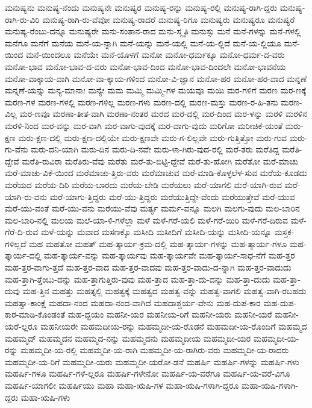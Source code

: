 {ಮನುಷ್ಯನು
ಮನುಷ್ಯ-ನೆಂದು
ಮನುಷ್ಯನೇ
ಮನುಷ್ಯರ
ಮನುಷ್ಯ-ರನ್ನು
ಮನುಷ್ಯ-ರಲ್ಲಿ
ಮನುಷ್ಯ-ರಾಗಿ-ದ್ದರು
ಮನುಷ್ಯ-ರಾಗಿ-ರು-ವಿರಿ
ಮನುಷ್ಯ-ರಾಗಿ-ರು-ವೆವೋ
ಮನುಷ್ಯ-ರಾದರೆ
ಮನುಷ್ಯ-ರಿಗೂ
ಮನುಷ್ಯರು
ಮನುಷ್ಯರೂ
ಮನುಷ್ಯರೆ
ಮನುಷ್ಯ-ರೆಂಬು-ದನ್ನೂ
ಮನುಷ್ಯರೇ
ಮನು-ಸಂತಾನ-ರಾದ
ಮನು-ಸ್ಮೃತಿ
ಮನುಸ್ಸು
ಮನೆ
ಮನೆ-ಗಳನ್ನು
ಮನೆ-ಗಳಲ್ಲಿ
ಮನೆಗೂ
ಮನೆಗೆ
ಮನೆಯ
ಮನೆ-ಯ-ನ್ನಾಗಿ
ಮನೆ-ಯನ್ನು
ಮನೆ-ಯಲ್ಲಿ
ಮನೆ-ಯ-ಲ್ಲಿದೆ
ಮನೆ-ಯ-ಲ್ಲಿಯೂ
ಮನೆ-ಯಿಂದ
ಮನೆ-ಯಿಂದಲೂ
ಮನೆಯೇ
ಮನೆ-ಯೊಳಗೆ
ಮನೋ
ಮನೋ-ಧರ್ಮಕ್ಕೂ
ಮನೋ-ಧರ್ಮ-ದ-ವರು
ಮನೋ-ಭಾವ
ಮನೋ-ಭಾವ-ದ-ವರು
ಮನೋ-ಭಾವ-ದಿಂದ
ಮನೋ-ಭಾವ-ದಿಂದಲೇ
ಮನೋ-ಭಾವನೆಯ
ಮನೋ-ವಾಕ್ಕಾಯ-ವಾಗಿ
ಮನೋ-ವಾ-ಕ್ಕಾಯ-ಗಳಿಂದ
ಮನೋ-ವಿ-ಜ್ಞಾನ
ಮನೋ-ಹರ
ಮನೋ-ಹರ-ವಾದ
ಮನ್ನಣೆ
ಮನ್ನಣೆ-ಯನ್ನು
ಮನ್ಯ-ಮಾನಾಃ
ಮನ್ಯೇ
ಮಮ
ಮಮ್ಮಿ
ಮಮ್ಮಿ-ಗಳ
ಮಯವೂ
ಮಯಿ
ಮರ-ಗಳಿಗೆ
ಮರಣ
ಮರ-ಣಕ್ಕೆ
ಮರಣ-ಗಳ
ಮರಣ-ಗಳಲ್ಲಿ
ಮರಣ-ಗಳಿಲ್ಲ
ಮರಣ-ಗಳು
ಮರಣ-ದಲ್ಲಿ
ಮರಣ-ಮಸ್ತು
ಮರಣ-ರ-ಹಿ-ತನು
ಮರಣ-ವಿಲ್ಲ
ಮರ-ಣವೂ
ಮರಣಾ-ತೀತ-ವಾಗಿ
ಮರಣಾ-ನಂತರ
ಮರದ
ಮರ-ದಲ್ಲಿ
ಮರ-ದಿಂದ
ಮರ-ಳನ್ನು
ಮರಳಿ
ಮರಳಿನ
ಮರಳಿ-ನಿಂದ
ಮರ-ವನ್ನು
ಮರ-ವಾಗಿ
ಮರ-ವಾಗು-ವುದಕ್ಕೆ
ಮರ-ವಾಗು-ವುದು
ಮರಿಗೋ
ಮರೀಚಿಕೆ-ಯಂತೆ
ಮರು-ಕ್ಷಣ
ಮರು-ಕ್ಷಣ-ದಲ್ಲಿ
ಮರು-ಕ್ಷಣ-ದಲ್ಲಿಯೇ
ಮರು-ಕ್ಷಣವೇ
ಮರು-ಗ-ಲಿಲ್ಲವೇ
ಮರು-ಗುತ್ತಿತ್ತೋ
ಮರು-ಗುವ
ಮರು-ಗು-ವೆನು
ಮರು-ದನಿ-ಯಾಗಿ
ಮರು-ದಿನ
ಮರು-ದಿ-ನವೇ
ಮರು-ಳಾ-ಗಿರು-ವುದ-ರಲ್ಲಿ
ಮರೆ-ತರು
ಮರೆತಿದ್ದ
ಮರೆತಿ-ದ್ದೇವೆ
ಮರೆತಿ-ರುವಿರಾ
ಮರೆತಿರು-ವೆವು
ಮರೆತು
ಮರೆ-ತು-ಬಿಟ್ಟಿ-ದ್ದೇವೆ
ಮರೆ-ತು-ಹೋಗಿ
ಮರೆತೋ
ಮರೆ-ಮಾಚು
ಮರೆ-ಮಾಚು-ವಿಕೆ-ಯಿಂದ
ಮರೆಮಾಚು-ತ್ತಿರು-ವರು
ಮರೆಮಾಚುವ
ಮರೆ-ಮಾಡಿ-ಕೊಳ್ಳಲೆಳ-ಸುವ
ಮರೆಯ-ಕೂಡದು
ಮರೆಯದ
ಮರೆಯ-ದಿರಿ
ಮರೆಯ-ಬಾರದು
ಮರೆಯ-ಬೇಡಿ
ಮರೆಯಲು
ಮರೆ-ಯಾಗಲಿ
ಮರೆ-ಯಾಗಿ-ರುವ
ಮರೆ-ಯಾಗಿ-ರು-ವನು
ಮರೆ-ಯಾಗು-ತ್ತಿದ್ದರು
ಮರೆ-ಯು-ತ್ತಿದ್ದರು
ಮರೆಯುತ್ತಿದ್ದೇ-ವೆಂದು
ಮರೆಯುತ್ತೇವೆ
ಮರೆ-ಯುವ
ಮರೆ-ಯು-ವಂತೆ
ಮರೆ-ಯು-ವನು
ಮರೆಯು-ವೆವು
ಮರ್ತ್ಯ
ಮರ್ಮ-ವನ್ನೂ
ಮಲಗಿ
ಮಲಗು-ವುದು
ಮಲ-ಬಾರಿನ
ಮಲ-ಬಾರಿ-ನಲ್ಲಿ
ಮಲಯ
ಮಲೆ-ಯಾ-ಳಿ-ಗಳೆಲ್ಲಾ
ಮಳೆ
ಮಳೆ-ಗರೆ-ಯಲಿ
ಮಳೆ-ಗರೆ-ಯಿರಿ
ಮಳೆ-ಗರೆ-ದಿರುವ
ಮಳೆ-ಗೆರೆ-ದಿ-ರುವ
ಮಳೆ-ಯನ್ನು
ಮವಾದ
ಮಸಣಕ್ಕೊ
ಮಸೀದಿ
ಮಸೀದಿಗೆ
ಮಸೀದಿ-ಯನ್ನು
ಮಸೀದಿ-ಯನ್ನೂ
ಮಸ್ತಕ-ಗಳಿಲ್ಲದೆ
ಮಹ
ಮಹತೋ
ಮಹತ್
ಮಹ-ತ್ಕಾರ್ಯ-ಕ್ರಮ-ದಲ್ಲಿ
ಮಹ-ತ್ಕಾರ್ಯ-ಗಳನ್ನು
ಮಹ-ತ್ಕಾರ್ಯ-ಗಳೂ
ಮಹ-ತ್ಕಾರ್ಯ-ದಲ್ಲಿ
ಮಹ-ತ್ಕಾರ್ಯ-ವನ್ನು
ಮಹ-ತ್ಕಾರ್ಯವು
ಮಹ-ತ್ಕಾರ್ಯವೇ
ಮಹ-ತ್ಕಾರ್ಯ-ಸಾಧ-ನೆಗೆ
ಮಹ-ತ್ತರ
ಮಹ-ತ್ತರ-ವಾಗು-ತ್ತದೆ
ಮಹ-ತ್ತರ-ವಾದ
ಮಹ-ತ್ತರ-ವಾದವು
ಮಹ-ತ್ತರ-ವಾದು-ದ-ನ್ನಾಗಿ
ಮಹ-ತ್ತರ-ವಾದುದು
ಮಹ-ತ್ತಾಗಿ-ತ್ತೆಂಬು-ದನ್ನು
ಮಹ-ತ್ತಾಗುತ್ತಿರು-ವುವು
ಮಹ-ತ್ತಾದ
ಮಹ-ತ್ತಾ-ದು-ದನ್ನು
ಮಹ-ತ್ತಾ-ದುದು
ಮಹ-ತ್ತಾ-ದುವು
ಮಹ-ತ್ತಿನ
ಮಹತ್ತು
ಮಹತ್ನಲ್ಲಿ
ಮಹತ್ವಕ್ಕೆ
ಮಹತ್ವದ
ಮಹತ್ವ-ವನ್ನು
ಮಹತ್ವ-ವಾಗಲಿ
ಮಹತ್ವ-ವಾಗಿ-ರಬಹದು
ಮಹತ್ವಾ-ಕಾಂಕ್ಷೆ
ಮಹದಾ-ನಂದ
ಮಹದಾ-ನಂದ-ವಾಗಿದೆ
ಮಹದಾಶ್ಚರ್ಯ-ವೇನು
ಮಹ-ದುಪ-ಕಾರ
ಮಹ-ದುಪ-ಕಾರ-ಮಾಡಿ-ಕೊಂಡಂತೆ
ಮಹ-ದ್ಭಯಂ
ಮಹನೀ-ಯರ
ಮಹನೀಯ-ರಿಗೆ
ಮಹನೀ-ಯರು
ಮಹನೀ-ಯರೆ
ಮಹನೀ-ಯರೆ-ಲ್ಲರೂ
ಮಹನೀಯರೇ
ಮಹಮದೀಯ-ರನ್ನು
ಮಹಮ್ಮದೀ-ಯ-ರೊಡನೆ
ಮಹಮದೀ-ಯ-ರೊಂದಿಗೆ
ಮಹಮ್ಮದ
ಮಹಮ್ಮದ್
ಮಹಮ್ಮದನ
ಮಹಮ್ಮದ-ನನ್ನು
ಮಹಮ್ಮದನು
ಮಹಮ್ಮದೀಯ
ಮಹಮ್ಮದೀ-ಯರ
ಮಹಮ್ಮದೀ-ಯ-ರನ್ನು
ಮಹಮ್ಮದೀ-ಯ-ರಲ್ಲಿ
ಮಹಮ್ಮದೀ-ಯ-ರಾಗಿ
ಮಹಮ್ಮದೀ-ಯ-ರಾಗಿರು-ವರು
ಮಹಮ್ಮದೀ-ಯ-ರಾದರು
ಮಹಮ್ಮದೀ-ಯ-ರಿಗೆ
ಮಹಮ್ಮದೀ-ಯರು
ಮಹಮ್ಮದೀ-ಯರೋ-ಡನೆ
ಮಹರ್ಷಿ
ಮಹರ್ಷಿ-ಗಳನ್ನು
ಮಹರ್ಷಿ-ಗಳು
ಮಹರ್ಷಿ-ಗಳೂ
ಮಹರ್ಷಿ-ಗಳೆ-ಲ್ಲರೂ
ಮಹರ್ಷಿ-ಗಳೇನೋ
ಮಹರ್ಷಿ-ಯ-ವರೆಗೂ
ಮಹರ್ಷಿ-ಯ-ವರೆ-ವಿಗೂ
ಮಹರ್ಷಿ-ಯಾಗಲೀ
ಮಹರ್ಷಿಯು
ಮಹಾ
ಮಹಾ-ಋಷಿ-ಗಳ
ಮಹಾ-ಋಷಿ-ಗಳಾಗಿ-ದ್ದರೂ
ಮಹಾ-ಋಷಿ-ಗಳಾಗಿ-ದ್ದರು
ಮಹಾ-ಋಷಿ-ಗಳು
}
